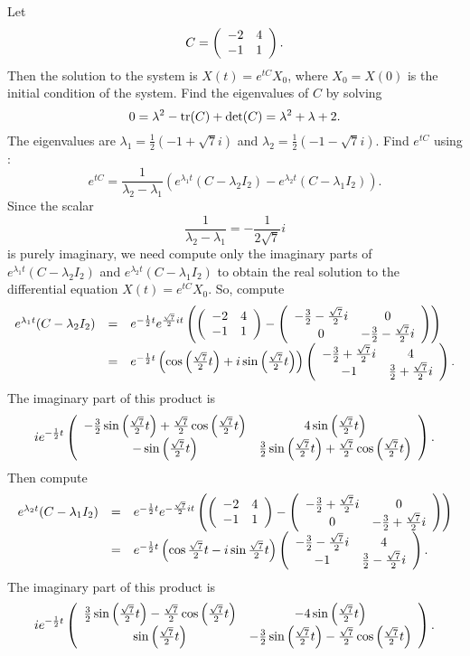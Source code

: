 \soln Let
\[
C = \left(\begin{array}{rr} -2 & 4\\ -1 &1\end{array}\right).
\]
Then the solution to the system is $X(t) = e^{tC}X_0$, where
$X_0 = X(0)$ is the initial condition of the system.
Find the eigenvalues of $C$ by solving
\[
0 = \lambda^2 - {\rm tr}(C) + \det(C) = \lambda^2 + \lambda + 2.
\]
The eigenvalues are $\lambda_1 = \frac{1}{2}(-1 + \sqrt{7}i)$ and
$\lambda_2 = \frac{1}{2}(-1 - \sqrt{7}i)$.  Find $e^{tC}$ using
:
\[
e^{tC} = \frac{1}{\lambda_2 - \lambda_1}(e^{\lambda_1 t}(C -
\lambda_2 I_2) - e^{\lambda_2 t}(C - \lambda_1 I_2)).
\]
Since the scalar
\[
\frac{1}{\lambda_2 - \lambda_1} = -\frac{1}{2\sqrt{7}}i
\]
is purely
imaginary, we need compute only the imaginary parts of
$e^{\lambda_1 t}(C - \lambda_2 I_2)$ and $e^{\lambda_2 t}(C - \lambda_1 I_2)$
to obtain the real solution to the differential equation $X(t) = e^{tC}X_0$.
So, compute
\[
\begin{array}{rcl}
e^{\lambda_1 t}(C - \lambda_2 I_2)
& = & e^{-\frac{1}{2}t}e^{\frac{\sqrt{7}}{2}it}
\left(\left(\begin{array}{rr} -2 & 4\\ -1 &1\end{array}\right) - \left(\begin{array}{cc} -\frac{3}{2} - \frac{\sqrt{7}}{2}i & 0\\ 0 &-\frac{3}{2} - \frac{\sqrt{7}}{2}i\end{array}\right)\right) \\
& = & e^{-\frac{1}{2}t}\left(\cos\left(\frac{\sqrt{7}}{2}t\right) +
i\sin\left(\frac{\sqrt{7}}{2}t\right)\right)
\left(\begin{array}{cc} -\frac{3}{2} + \frac{\sqrt{7}}{2}i & 4\\ -1 &\frac{3}{2} +
\frac{\sqrt{7}}{2}i\end{array}\right).
\end{array}
\]
The imaginary part of this product is
\[
ie^{-\frac{1}{2}t}\left(\begin{array}{cc} -\frac{3}{2}\sin\left(\frac{\sqrt{7}}{2}
t\right) + \frac{\sqrt{7}}{2}\cos\left(\frac{\sqrt{7}}{2}t\right) & 4\sin\left(\frac{\sqrt{7}}{2}t\right)\\ -\sin\left(\frac{\sqrt{7}}{2}t\right) &\frac{3}{2}\sin\left(\frac{\sqrt{7}}{2}
t\right) + \frac{\sqrt{7}}{2}\cos\left(\frac{\sqrt{7}}{2}t\right)\end{array}\right).
\]
Then compute
\[
\begin{array}{rcl}
e^{\lambda_2 t}(C - \lambda_1 I_2)
& = & e^{-\frac{1}{2}t}e^{-\frac{\sqrt{7}}{2}it}
\left(\left(\begin{array}{rr} -2 & 4\\ -1 &1\end{array}\right) - \left(\begin{array}{cc} -\frac{3}{2} + \frac{\sqrt{7}}{2}i & 0\\ 0 &-\frac{3}{2} + \frac{\sqrt{7}}{2}i\end{array}\right)\right) \\
& = & e^{-\frac{1}{2}t}\left(\cos\frac{\sqrt{7}}{2}t -
i\sin\frac{\sqrt{7}}{2}t\right)
\left(\begin{array}{cc} -\frac{3}{2} - \frac{\sqrt{7}}{2}i & 4\\ -1 &\frac{3}{2} -
\frac{\sqrt{7}}{2}i\end{array}\right).
\end{array}
\]
The imaginary part of this product is
\[
ie^{-\frac{1}{2}t}\left(\begin{array}{cc} \frac{3}{2}\sin\left(\frac{\sqrt{7}}{2}
t\right) - \frac{\sqrt{7}}{2}\cos\left(\frac{\sqrt{7}}{2}t\right) & -4\sin\left(\frac{\sqrt{7}}{2}t\right)\\ \sin\left(\frac{\sqrt{7}}{2}t\right) &-\frac{3}{2}\sin\left(\frac{\sqrt{7}}{2}
t\right) - \frac{\sqrt{7}}{2}\cos\left(\frac{\sqrt{7}}{2}t\right)\end{array}\right).
\]

